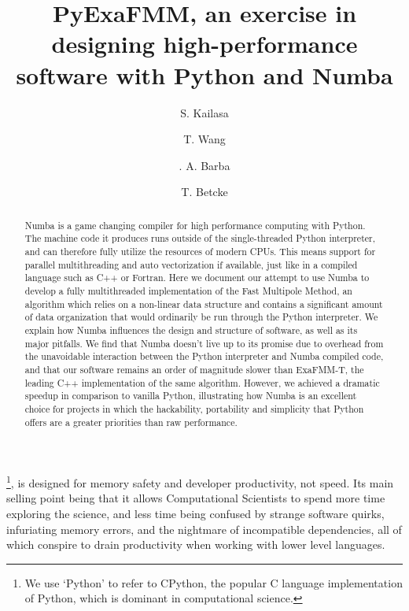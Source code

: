 \documentclass{IEEEcsmag}
\begin{document}

\title{PyExaFMM, an exercise in designing high-performance software with Python and Numba}

\author{S. Kailasa}

\author{T. Wang}

\author{. A. Barba}

\author{T. Betcke}


\begin{abstract}
    Numba is a game changing compiler for high performance computing with Python. The machine code it produces runs outside of the single-threaded Python interpreter, and can therefore fully utilize the resources of modern CPUs. This means support for parallel multithreading and auto vectorization if available, just like in a compiled language such as C++ or Fortran. Here we document our attempt to use Numba to develop a fully multithreaded implementation of the Fast Multipole Method, an algorithm which relies on a non-linear data structure and contains a significant amount of data organization that would ordinarily be run through the Python interpreter. We explain how Numba influences the design and structure of software, as well as its major pitfalls. We find that Numba doesn't live up to its promise due to overhead from the unavoidable interaction between the Python interpreter and Numba compiled code, and that our software remains an order of magnitude slower than ExaFMM-T, the leading C++ implementation of the same algorithm. However, we achieved a dramatic speedup in comparison to vanilla Python, illustrating how Numba is an excellent choice for projects in which the hackability, portability and simplicity that Python offers are a greater priorities than raw performance.
\end{abstract}

\maketitle
{}\footnote{We use `Python' to refer to CPython, the popular C language implementation of Python, which is dominant in computational science.}, is designed for memory safety and developer productivity, not speed. Its main selling point being that it allows Computational Scientists to spend more time exploring the science, and less time being confused by strange software quirks, infuriating memory errors, and the nightmare of incompatible dependencies, all of which conspire to drain productivity when working with lower level languages.
\end{document}
